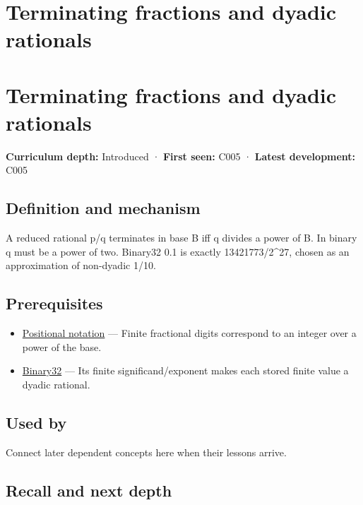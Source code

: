 \hypertarget{appendix-2a2f1b74bdd3}{}
\section*{Terminating fractions and dyadic rationals}
\section{Terminating fractions and dyadic rationals}\label{appendix-2a2f1b74bdd3-terminating-fractions-and-dyadic-rationals}

\textbf{Curriculum depth:} Introduced · \textbf{First seen:} C005 · \textbf{Latest development:} C005

\subsection{Definition and mechanism}\label{appendix-2a2f1b74bdd3-definition-and-mechanism}

A reduced rational p/q terminates in base B iff q divides a power of B. In binary q must be a power of two. Binary32 0.1 is exactly 13421773/2\^{}27, chosen as an approximation of non-dyadic 1/10.

\subsection{Prerequisites}\label{appendix-2a2f1b74bdd3-prerequisites}

\begin{itemize}
\tightlist
\item
  \hyperref[appendix-83c3f28f7bda]{Positional notation} --- Finite fractional digits correspond to an integer over a power of the base.
\item
  \hyperref[appendix-5057f9ad327f]{Binary32} --- Its finite significand/exponent makes each stored finite value a dyadic rational.
\end{itemize}

\subsection{Used by}\label{appendix-2a2f1b74bdd3-used-by}

Connect later dependent concepts here when their lessons arrive.

\subsection{Recall and next depth}\label{appendix-2a2f1b74bdd3-recall-and-next-depth}

